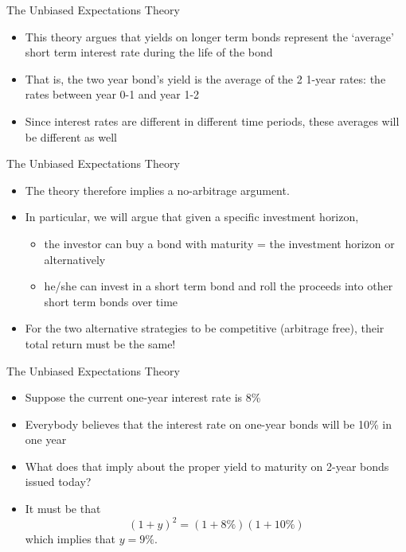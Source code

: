\documentclass{beamer}
\begin{document}
\begin{frame}{The Unbiased Expectations Theory}
\begin{itemize}
    \item This theory argues that yields on longer term bonds represent the ‘average’ short term interest rate during the life of the bond
    \item That is, the two year bond’s yield is the average of the 2 1-year rates: the rates between year 0-1 and year 1-2
    \item Since interest rates are different in different time periods, these averages will be different as well
\end{itemize}
\end{frame}
        
\begin{frame}{The Unbiased Expectations Theory}
\begin{itemize}
    \item The theory therefore implies a no-arbitrage argument. 
    \item In particular, we will argue that given a specific investment horizon, 
        \begin{itemize}
            \item the investor can buy a bond with maturity = the investment horizon
or alternatively 
            \item he/she can invest in a short term bond and roll the proceeds into other short term bonds over time
        \end{itemize}
    \item For the two alternative strategies to be competitive (arbitrage free), their total return must be the same!
\end{itemize}
\end{frame}

\begin{frame}{The Unbiased Expectations Theory}
\begin{itemize}
    \item Suppose the current one-year interest rate is 8\%
    \item Everybody believes that the interest rate on one-year bonds will be 10\% in one year
    \item What does that imply about the proper yield to maturity on 2-year bonds issued today?
    \item It must be that
        \begin{equation}
            (1+y)^{2}=(1+8\%)(1+10\%)
        \end{equation}
        which implies that $y=9\%$. 
\end{itemize}
\end{frame}
\end{document}
